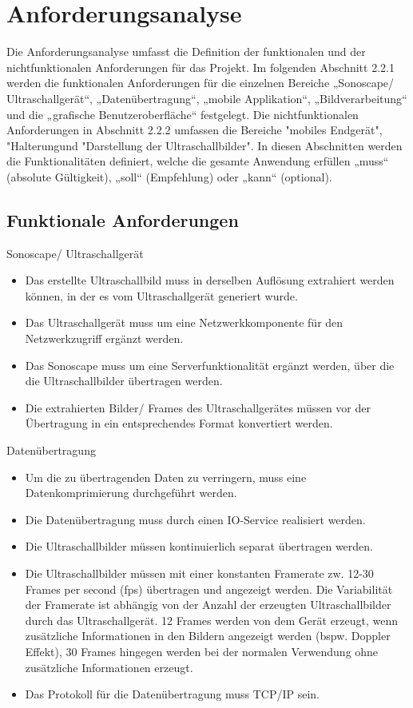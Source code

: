 \section{Anforderungsanalyse}  \label{AnfAnalyse}
Die Anforderungsanalyse umfasst die Definition der funktionalen und der nichtfunktionalen Anforderungen für das Projekt. Im folgenden Abschnitt 2.2.1 werden die funktionalen Anforderungen für die einzelnen Bereiche „Sonoscape/ Ultraschallgerät“, „Datenübertragung“, „mobile Applikation“, „Bildverarbeitung“ und die „grafische Benutzeroberfläche“ festgelegt. Die nichtfunktionalen Anforderungen in Abschnitt 2.2.2 umfassen die Bereiche "mobiles Endgerät", "Halterung\grqq und "Darstellung der Ultraschallbilder". In diesen Abschnitten werden die  Funktionalitäten definiert, welche die gesamte Anwendung erfüllen „muss“ (absolute Gültigkeit), „soll“ (Empfehlung) oder „kann“ (optional).   
\subsection{Funktionale Anforderungen} \label{FunkAnf}
\begin{minipage}{\textwidth}
Sonoscape/ Ultraschallgerät
\begin{itemize}
\item Das erstellte Ultraschallbild muss in derselben Auflösung extrahiert werden können, in der es vom Ultraschallgerät generiert wurde.
\item Das Ultraschallgerät muss um eine Netzwerkkomponente für den Netzwerkzugriff ergänzt werden.
\item Das Sonoscape muss um eine Serverfunktionalität ergänzt werden, über die die Ultraschallbilder übertragen werden.
\item Die extrahierten Bilder/ Frames des Ultraschallgerätes müssen vor der Übertragung in ein entsprechendes Format konvertiert werden.\\
\end{itemize}
\end{minipage}

\begin{minipage}{\textwidth}
Datenübertragung
\begin{itemize}
\item Um die zu übertragenden Daten zu verringern, muss eine Datenkomprimierung durchgeführt werden. 
\item Die Datenübertragung muss durch einen IO-Service realisiert werden.
\item Die Ultraschallbilder müssen kontinuierlich separat übertragen werden.
\item Die Ultraschallbilder müssen mit einer konstanten Framerate zw. 12-30 Frames per second (fps) übertragen und angezeigt werden. Die Variabilität der Framerate ist abhängig von der Anzahl der erzeugten Ultraschallbilder durch das Ultraschallgerät. 12 Frames werden von dem Gerät erzeugt, wenn zusätzliche Informationen in den Bildern angezeigt werden (bspw. Doppler Effekt), 30 Frames hingegen werden bei der normalen Verwendung ohne zusätzliche Informationen erzeugt.
\item Das Protokoll für die Datenübertragung muss TCP/IP sein.
\end{itemize}
\end{minipage}

